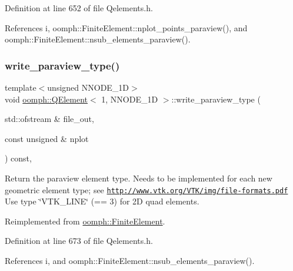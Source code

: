 Definition at line 652 of file Qelements.\+h.



References i, oomph\+::\+Finite\+Element\+::nplot\+\_\+points\+\_\+paraview(), and oomph\+::\+Finite\+Element\+::nsub\+\_\+elements\+\_\+paraview().

\mbox{\label{classoomph_1_1QElement_3_011_00_01NNODE__1D_01_4_ad67ce1247dd524db694c6e2d33ec1ffb}} 
\subsubsection{\texorpdfstring{write\+\_\+paraview\+\_\+type()}{write\_paraview\_type()}}
{\footnotesize\ttfamily template$<$unsigned N\+N\+O\+D\+E\+\_\+1D$>$ \\
void \hyperlink{classoomph_1_1QElement}{oomph\+::\+Q\+Element}$<$ 1, N\+N\+O\+D\+E\+\_\+1D $>$\+::write\+\_\+paraview\+\_\+type (\begin{DoxyParamCaption}\item[{std\+::ofstream \&}]{file\+\_\+out,  }\item[{const unsigned \&}]{nplot }\end{DoxyParamCaption}) const\hspace{0.3cm}{\ttfamily [inline]}, {\ttfamily [virtual]}}



Return the paraview element type. Needs to be implemented for each new geometric element type; see \href{http://www.vtk.org/VTK/img/file-formats.pdf}{\tt http\+://www.\+vtk.\+org/\+V\+T\+K/img/file-\/formats.\+pdf} Use type \char`\"{}\+V\+T\+K\+\_\+\+L\+I\+N\+E\char`\"{} (== 3) for 2D quad elements. 



Reimplemented from \hyperlink{classoomph_1_1FiniteElement_a68f0f8dc76f04e7d69983ec711b4ab08}{oomph\+::\+Finite\+Element}.



Definition at line 673 of file Qelements.\+h.



References i, and oomph\+::\+Finite\+Element\+::nsub\+\_\+elements\+\_\+paraview().



